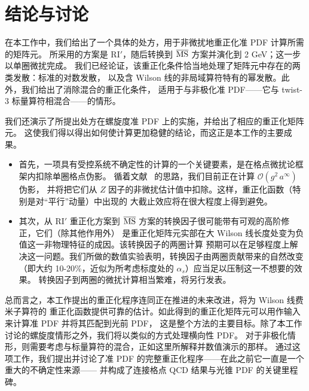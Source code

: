 \section{结论与讨论}

在本工作中，我们给出了一个具体的处方，用于非微扰地重正化准 PDF 计算所需的矩阵元。
所采用的方案是 RI$'$，随后转换到 ${\overline{\rm MS}}$ 方案并演化到 2 GeV；这一步以单圈微扰完成。
我们已经论证，该重正化条件恰当地处理了矩阵元中存在的两类发散：标准的对数发散，
以及含 Wilson 线的非局域算符特有的幂发散。此外，我们给出了消除混合的重正化条件，
适用于与非极化准 PDF——它与 twist-3 标量算符相混合——的情形。

\medskip
我们还演示了所提出处方在螺旋度准 PDF 上的实施，并给出了相应的重正化矩阵元。
这使我们得以得出如何使计算更加稳健的结论，而这正是本工作的主要成果。
\begin{itemize}
\item 首先，一项具有受控系统不确定性的计算的一个关键要素，是在格点微扰论框架内扣除单圈格点伪影。
循着文献~\cite{Alexandrou:2015sea} 的思路，我们目前正在计算 $\mathcal{O}(g^2\,a^\infty)$ 伪影，
并将把它们从 $Z$ 因子的非微扰估计值中扣除。这样，重正化函数（特别是对``平行''动量）中出现的
大截止效应将在很大程度上得到避免。
\item 其次，从 RI$'$ 重正化方案到 ${\overline{\rm MS}}$ 方案的转换因子很可能带有可观的高阶修正，它们（除其他作用外）
是重正化矩阵元实部在大 Wilson 线长度处变为负值这一非物理特征的成因。该转换因子的两圈计算
预期可以在足够程度上解决这一问题。我们所做的数值实验表明，转换因子由两圈贡献带来的自然改变
（即大约 10-20\%，近似为所考虑标度处的 $\alpha_s$）应当足以压制这一不想要的效果。
转换因子到两圈的微扰计算相当繁难，将另行发表。
\end{itemize}

\medskip
总而言之，本工作提出的重正化程序连同正在推进的未来改进，将为 Wilson 线费米子算符的
重正化函数提供可靠的估计。如此得到的重正化矩阵元可以用作输入来计算准 PDF 并将其匹配到光前 PDF，
这是整个方法的主要目标。除了本工作讨论的螺旋度情形之外，我们将以类似的方式处理横向性 PDF。
对于非极化情形，则需要考虑与标量算符的混合，正如这里所解释并数值演示的那样。
通过这项工作，我们提出并讨论了准 PDF 的完整重正化程序——在此之前它一直是一个重大的不确定性来源——
并构成了连接格点 QCD 结果与光锥 PDF 的关键里程碑。
